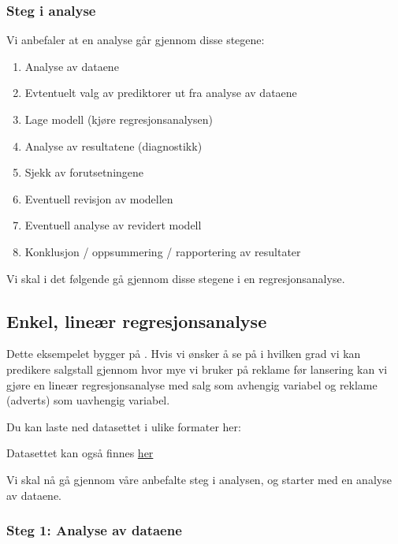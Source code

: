 \documentclass[
]{article}
\begin{document}
\hypertarget{steg-i-analyse}{%
\subsubsection{Steg i analyse}\label{steg-i-analyse}}

Vi anbefaler at en analyse går gjennom disse stegene:

\begin{enumerate}
\def\labelenumi{\arabic{enumi}.}
\item
  Analyse av dataene
\item
  Evtentuelt valg av prediktorer ut fra analyse av dataene
\item
  Lage modell (kjøre regresjonsanalysen)
\item
  Analyse av resultatene (diagnostikk)
\item
  Sjekk av forutsetningene
\item
  Eventuell revisjon av modellen
\item
  Eventuell analyse av revidert modell
\item
  Konklusjon / oppsummering / rapportering av resultater
\end{enumerate}

Vi skal i det følgende gå gjennom disse stegene i en regresjonsanalyse.

\hypertarget{enkel-lineuxe6r-regresjonsanalyse}{%
\subsection{Enkel, lineær regresjonsanalyse}\label{enkel-lineuxe6r-regresjonsanalyse}}

Dette eksempelet bygger på \citet{fieldDiscoveringStatisticsUsing2009}. Hvis vi ønsker å se på i hvilken grad vi kan predikere salgstall gjennom hvor mye vi bruker på reklame før lansering kan vi gjøre en lineær regresjonsanalyse med salg som avhengig variabel og reklame (adverts) som uavhengig variabel.

Du kan laste ned datasettet i ulike formater her:

Datasettet kan også finnes \href{https://edge.sagepub.com/field5e/student-resources/datasets}{her}

Vi skal nå gå gjennom våre anbefalte steg i analysen, og starter med en analyse av dataene.

\hypertarget{steg-1-analyse-av-dataene}{%
\subsubsection{Steg 1: Analyse av dataene}\label{steg-1-analyse-av-dataene}}
\end{document}

